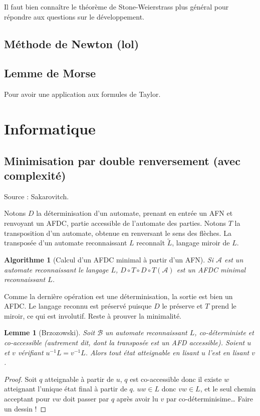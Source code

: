 \documentclass[a4paper, 11pt]{article}
\newtheorem*{algo}{Algorithme}
\newtheorem*{lemma}{Lemme}
\begin{document}
Il faut bien connaître le théorème de Stone-Weierstrass plus général pour
répondre aux questions sur le développement.

\subsection{Méthode de Newton (lol)}

\subsection{Lemme de Morse}

Pour avoir une application aux formules de Taylor.

\section{Informatique}

\subsection{Minimisation par double renversement (avec complexité)}

Source : Sakarovitch.

Notons $D$ la déterminisation d'un automate, prenant en entrée un AFN et
renvoyant un AFDC, partie accessible de l'automate des parties. Notons $T$ la
transposition d'un automate, obtenue en renversant le sens des flèches. La
transposée d'un automate reconnaissant $L$ reconnaît $\tilde{L}$, langage miroir
de $L$.

\begin{algo}[Calcul d'un AFDC minimal à partir d'un AFN]
  Si $\mathcal{A}$ est un automate reconnaissant le langage $L$, $D \circ T
  \circ D \circ T(\mathcal{A})$ est un AFDC minimal reconnaissant $L$.
\end{algo}

Comme la dernière opération est une déterminisation, la sortie est bien un AFDC.
Le langage reconnu est préservé puisque $D$ le préserve et $T$ prend le miroir,
ce qui est involutif. Reste à prouver la minimalité.

\begin{lemma}[Brzozowski]
  Soit $\mathcal{B}$ un automate reconnaissant $L$, \emph{co-déterministe} et
  \emph{co-accessible} (autrement dit, dont la transposée est un AFD
  accessible). Soient $u$ et $v$ vérifiant $u^{-1}L = v^{-1}L$. Alors tout état
  atteignable en lisant $u$ l'est en lisant $v$.
\end{lemma}
\begin{proof}
  Soit $q$ atteignable à partir de $u$, $q$ est co-accessible donc il existe $w$
  atteignant l'unique état final à partir de $q$. $uw \in L$ donc $vw \in L$, et
  le seul chemin acceptant pour $vw$ doit passer par $q$ après avoir lu $v$ par
  co-déterminisime… Faire un dessin !
\end{proof}
\end{document}
